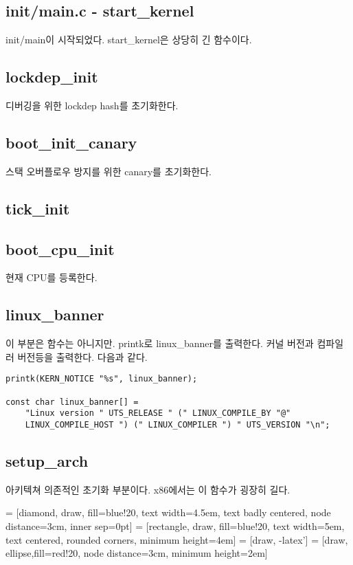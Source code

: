\documentclass[a4paper,11pt]{report}
\begin{document}
\begin{CJK}{UTF8}{}
\section{init/main.c - start\_kernel}
init/main이 시작되었다.
start\_kernel은 상당히 긴 함수이다.
\subsection{lockdep\_init}
디버깅을 위한 lockdep hash를 초기화한다.
\subsection{boot\_init\_canary}
스택 오버플로우 방지를 위한 canary를 초기화한다.
\subsection{tick\_init}
\subsection{boot\_cpu\_init}
현재 CPU를 등록한다.
\subsection{linux\_banner}
이 부분은 함수는 아니지만.
printk로 linux\_banner를 출력한다.
커널 버전과 컴파일러 버전등을 출력한다.
다음과 같다.

\begin{lstlisting}[label=lst:linux_banner]
printk(KERN_NOTICE "%s", linux_banner);

const char linux_banner[] =
	"Linux version " UTS_RELEASE " (" LINUX_COMPILE_BY "@"
	LINUX_COMPILE_HOST ") (" LINUX_COMPILER ") " UTS_VERSION "\n";
\end{lstlisting}

\subsection{setup\_arch}
아키텍쳐 의존적인 초기화 부분이다.
x86에서는 이 함수가 굉장히 길다.


 = [diamond, draw, fill=blue!20, 
    text width=4.5em, text badly centered, node distance=3cm, inner sep=0pt]
 = [rectangle, draw, fill=blue!20, 
    text width=5em, text centered, rounded corners, minimum height=4em]
 = [draw, -latex']
 = [draw, ellipse,fill=red!20, node distance=3cm,
    minimum height=2em]


\end{CJK}
\end{document}
